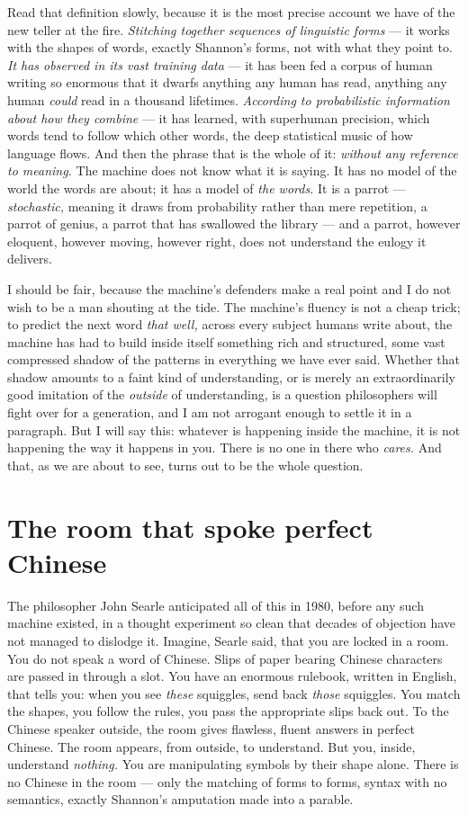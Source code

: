 Read that definition slowly, because it is the most precise account we have of the new teller at the fire. \emph{Stitching together sequences of linguistic forms} — it works with the shapes of words, exactly Shannon's forms, not with what they point to. \emph{It has observed in its vast training data} — it has been fed a corpus of human writing so enormous that it dwarfs anything any human has read, anything any human \emph{could} read in a thousand lifetimes. \emph{According to probabilistic information about how they combine} — it has learned, with superhuman precision, which words tend to follow which other words, the deep statistical music of how language flows. And then the phrase that is the whole of it: \emph{without any reference to meaning.} The machine does not know what it is saying. It has no model of the world the words are about; it has a model of \emph{the words.} It is a parrot — \emph{stochastic,} meaning it draws from probability rather than mere repetition, a parrot of genius, a parrot that has swallowed the library — and a parrot, however eloquent, however moving, however right, does not understand the eulogy it delivers.

I should be fair, because the machine's defenders make a real point and I do not wish to be a man shouting at the tide. The machine's fluency is not a cheap trick; to predict the next word \emph{that well,} across every subject humans write about, the machine has had to build inside itself something rich and structured, some vast compressed shadow of the patterns in everything we have ever said. Whether that shadow amounts to a faint kind of understanding, or is merely an extraordinarily good imitation of the \emph{outside} of understanding, is a question philosophers will fight over for a generation, and I am not arrogant enough to settle it in a paragraph. But I will say this: whatever is happening inside the machine, it is not happening the way it happens in you. There is no one in there who \emph{cares.} And that, as we are about to see, turns out to be the whole question.

\section*{The room that spoke perfect Chinese}

The philosopher John Searle anticipated all of this in 1980, before any such machine existed, in a thought experiment so clean that decades of objection have not managed to dislodge it. Imagine, Searle said, that you are locked in a room. You do not speak a word of Chinese. Slips of paper bearing Chinese characters are passed in through a slot. You have an enormous rulebook, written in English, that tells you: when you see \emph{these} squiggles, send back \emph{those} squiggles. You match the shapes, you follow the rules, you pass the appropriate slips back out. To the Chinese speaker outside, the room gives flawless, fluent answers in perfect Chinese. The room appears, from outside, to understand. But you, inside, understand \emph{nothing.} You are manipulating symbols by their shape alone. There is no Chinese in the room — only the matching of forms to forms, syntax with no semantics, exactly Shannon's amputation made into a parable.

